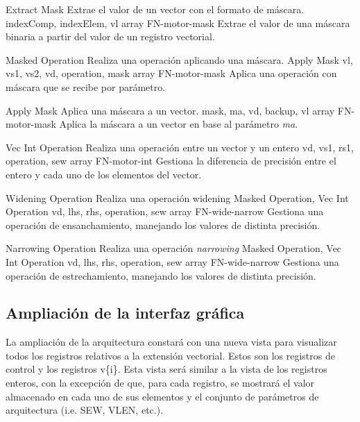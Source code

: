 \begin{component}{Extract Mask} %
{Extrae el valor de un vector con el formato de máscara.}
{\NA}
{indexComp, indexElem, vl}
{array}
{FN-motor-mask}
Extrae el valor de una máscara binaria a partir del valor de un registro vectorial.
\end{component}

\begin{component}{Masked Operation} %
{Realiza una operación aplicando una máscara.}
{Apply Mask}
{vl, vs1, vs2, vd, operation, mask}
{array}
{FN-motor-mask}
Aplica una operación con máscara que se recibe por parámetro.
\end{component}

\begin{component}{Apply Mask} %
{Aplica una máscara a un vector.}
{\NA}
{mask, ma, vd, backup, vl}
{array}
{FN-motor-mask}
Aplica la máscara a un vector en base al parámetro \textit{ma}.
\end{component}

\begin{component}{Vec Int Operation} %
{Realiza una operación entre un vector y un entero}
{\NA}
{vd, vs1, rs1, operation, sew}
{array}
{FN-motor-int}
Gestiona la diferencia de precisión entre el entero y cada uno de los elementos del vector.
\end{component}


\begin{component}{Widening Operation} %
{Realiza una operación widening}
{Masked Operation, Vec Int Operation}
{vd, lhs, rhs, operation, sew}
{array}
{FN-wide-narrow}
Gestiona una operación de ensanchamiento, manejando los valores de distinta precisión.
\end{component}

\begin{component}{Narrowing Operation} %
{Realiza una operación \textit{narrowing}}
{Masked Operation, Vec Int Operation}
{vd, lhs, rhs, operation, sew}
{array}
{FN-wide-narrow}
Gestiona una operación de estrechamiento, manejando los valores de distinta precisión.
\end{component}
\FloatBarrier

\subsection{Ampliación de la interfaz gráfica}

La ampliación de la arquitectura constará con una nueva vista para 
visualizar todos los registros relativos a la extensión vectorial.
Estos son los registros de control y los registros v\{i\}. Esta vista será
similar a la vista de los registros enteros, con la excepción de que, para cada
registro, se mostrará el valor almacenado en cada uno de sus elementos y el
conjunto de parámetros de arquitectura (i.e. SEW, VLEN, etc.).

